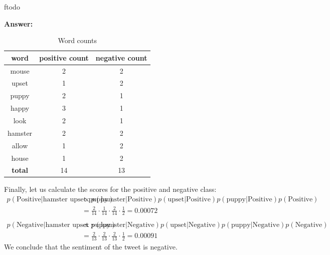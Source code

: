 ƒtodo\documentclass{article}
\newenvironment{QandA}{\begin{enumerate}[label=\arabic*.]}{\end{enumerate}}
\newenvironment{InnerQandA}{\begin{enumerate}[label=\roman*.]}{\end{enumerate}}
\newenvironment{answer}{\par\normalfont \textbf{Answer:}}{}
\newcommand{\g}{\vert}
\begin{document}
\begin{QandA}
\begin{InnerQandA}
\begin{answer}
        \begin{table}[h!]
        \centering
        \begin{tabular}{|c|c|c|}
        \hline
        \textbf{word}  & \textbf{positive count} & \textbf{negative count} \\ \hline
        mouse          & 2                       & 2                       \\ \hline
        upset          & 1                       & 2                       \\ \hline
        puppy          & 2                       & 1                       \\ \hline
        happy          & 3                       & 1                       \\ \hline
        look           & 2                       & 1                       \\ \hline
        hamster        & 2                       & 2                       \\ \hline
        allow          & 1                       & 2                       \\ \hline
        house          & 1                       & 2                       \\ \hline \hline
        \textbf{total} & 14                      & 13                      \\ \hline
        \end{tabular}
        \caption{Word counts}
        \label{tab:word-counts}
        \end{table}
        Finally, let us calculate the scores for the positive and negative class:
        \begin{align*}
            p(\text{Positive} \g \text{hamster upset puppy}) &\propto p(\text{hamster} \g \text{Positive}) p(\text{upset} \g \text{Positive}) p(\text{puppy} \g \text{Positive}) p(\text{Positive})\\
            &= \frac{2}{14} \cdot \frac{1}{14} \cdot \frac{2}{14} \cdot \frac{1}{2} = 0.00072\\\\
            p(\text{Negative} \g \text{hamster upset puppy}) &\propto p(\text{hamster} \g \text{Negative}) p(\text{upset} \g \text{Negative}) p(\text{puppy} \g \text{Negative}) p(\text{Negative})\\
            &= \frac{2}{13} \cdot \frac{2}{13} \cdot \frac{2}{13} \cdot \frac{1}{2} = 0.00091
        \end{align*}
        We conclude that the sentiment of the tweet is negative.


\end{answer}
\end{InnerQandA}
\end{QandA}
\end{document}
